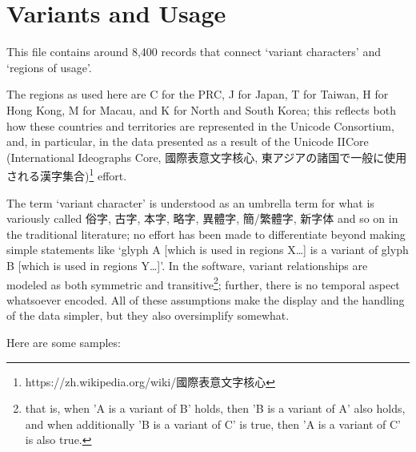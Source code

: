 \section{Variants and Usage
}
\begin{multicols}{2}This file contains around 8,400 records that connect ‘variant characters’
and ‘regions of usage’.\mktsShowpar\par
The regions as used here are {\mktsStyleCode{}C} for the PRC,
{\mktsStyleCode{}J} for Japan, {\mktsStyleCode{}T} for Taiwan, {\mktsStyleCode{}H} for Hong Kong, {\mktsStyleCode{}M} for Macau, and
{\mktsStyleCode{}K} for North and South Korea; this reflects both how these countries
and territories are represented in the Unicode Consortium, and, in
particular, in the data presented as a result of the Unicode
IICore (International Ideographs Core, {\cjk{}國際表意文字核心},
{\cjk{}東{\ka{}アジア}{\hi{}の}諸国{\hi{}で}一般{\hi{}に}使用{\hi{}される}漢字集合})\footnote{{\mktsStyleCode{}https://zh.wikipedia.org/wiki/{\cjk{}國際表意文字核心}}}
effort.\mktsShowpar\par
The term ‘variant character’ is understood as an umbrella term
for what is variously called {\cjk{}俗字}, {\cjk{}古字}, {\cjk{}本字}, {\cjk{}略字}, {\cjk{}異體字}, {\cjk{}簡}/{\cjk{}繁體字}, {\cjk{}新字体}
and so on in the traditional literature; no effort has been made
to differentiate beyond making simple statements like ‘glyph A
[which is used in regions X…] is a variant of glyph B [which is used
in regions Y…]’. In the software, variant relationships are
modeled as both symmetric and
transitive\footnote{that is, when 'A is a variant of B' holds, then
'B is a variant of A' also holds, and when additionally 'B is a variant of C'
is true, then 'A is a variant of C' is also true.}; further, there
is no temporal aspect whatsoever encoded. All of these assumptions
make the display and the handling of the data simpler, but they
also oversimplify somewhat.\mktsShowpar\par
Here are some samples:\mktsShowpar\par
\begingroup\mktsObeyAllLines{}


\end{multicols}
